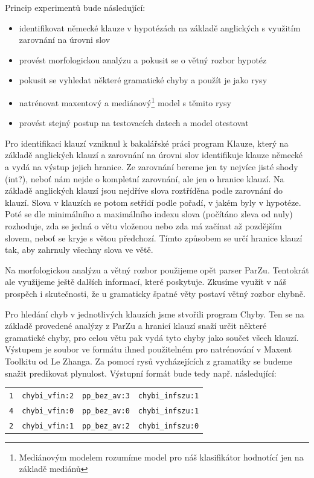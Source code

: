 \documentclass[12pt,a4paper]{report}
\begin{document}
Princip experimentů bude následující:
\begin{itemize}
\item{identifikovat německé klauze v hypotézách na základě anglických s využitím zarovnání na úrovni slov}
\item{provést morfologickou analýzu a pokusit se o větný rozbor hypotéz}
\item{pokusit se vyhledat některé gramatické chyby a použít je jako rysy}
\item{natrénovat maxentový a mediánový\footnote{Mediánovým modelem rozumíme model pro náš klasifikátor hodnotící jen na základě mediánů} model s těmito rysy}
\item{provést stejný postup na testovacích datech a model otestovat}
\end{itemize}

Pro identifikaci klauzí vzniknul k bakalářské práci program Klauze, který na základě anglických klauzí a zarovnání na úrovni slov identifikuje klauze německé a vydá na výstup jejich hranice. Ze zarovnání bereme jen ty nejvíce jisté shody (int?), neboť nám nejde o kompletní zarovnání, ale jen o hranice klauzí. Na základě anglických klauzí jsou nejdříve slova roztříděna podle zarovnání do klauzí. Slova v klauzích se potom setřídí podle pořadí, v jakém byly v hypotéze. Poté se dle minimálního a maximálního indexu slova (počítáno zleva od nuly) rozhoduje, zda se jedná o větu vloženou nebo zda má začínat až pozdějším slovem, neboť se kryje s větou předchozí. Tímto způsobem se určí hranice klauzí tak, aby zahrnuly všechny slova ve větě.

Na morfologickou analýzu a větný rozbor použijeme opět parser ParZu. Tentokrát ale využijeme ještě dalších informací, které poskytuje. Zkusíme využít v náš prospěch i skutečnosti, že u gramaticky špatné věty postaví větný rozbor chybně.

Pro hledání chyb v jednotlivých klauzích jsme stvořili program Chyby. Ten se na základě provedené analýzy z ParZu a hranicí klauzí snaží určit některé gramatické chyby, pro celou větu pak vydá tyto chyby jako součet všech klauzí. Výstupem je soubor ve formátu ihned použitelném pro natrénování v Maxent Toolkitu od Le Zhanga. Za pomocí rysů vycházejících z gramatiky se budeme snažit predikovat plynulost. Výstupní formát bude tedy např. následující:

\begin{center}
\begin{tabular}{llll}
\hline
\texttt{1} & \texttt{chybi\_vfin:2} & \texttt{pp\_bez\_av:3} & \texttt{chybi\_infszu:1} \\
\texttt{4} & \texttt{chybi\_vfin:0} & \texttt{pp\_bez\_av:0} & \texttt{chybi\_infszu:1} \\
\texttt{2} & \texttt{chybi\_vfin:1} & \texttt{pp\_bez\_av:2} & \texttt{chybi\_infszu:0} \\
\hline
\end{tabular}
\end{center}
\end{document}
